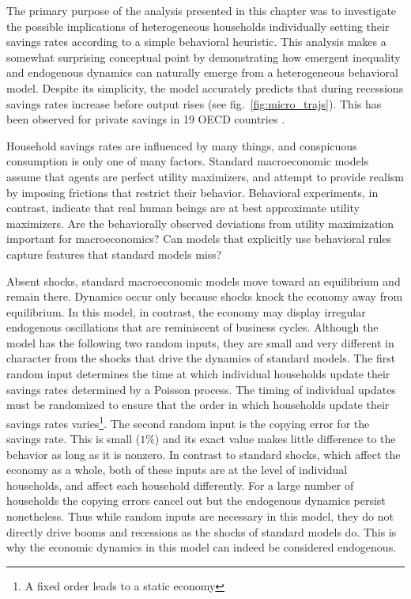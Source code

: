 The primary purpose of the analysis presented in this chapter was to investigate the possible implications of heterogeneous households individually setting their savings rates according to a simple behavioral heuristic. This analysis makes a somewhat surprising conceptual point by demonstrating how emergent inequality and endogenous dynamics can naturally emerge from a heterogeneous behavioral model. Despite its simplicity, the model accurately predicts that during recessions savings rates increase before output rises (see fig.~\ref{fig:micro_trajs}).
This has been observed for private savings in 19 OECD countries \citep{adema2015business}. 

Household savings rates are influenced by many things, and conspicuous consumption is only one of many factors. Standard macroeconomic models assume that agents are perfect utility maximizers, and attempt to provide realism by imposing frictions that restrict their behavior. Behavioral experiments, in contrast, indicate that real human beings are at best approximate utility maximizers.  Are the behaviorally observed deviations from utility maximization important for macroeconomics?  Can models that explicitly use behavioral rules capture features that standard models miss?

Absent shocks, standard macroeconomic models move toward an equilibrium and remain there.   Dynamics occur only because shocks knock the economy away from equilibrium. In this model, in contrast, the economy may display irregular endogenous oscillations that are reminiscent of business cycles.  
Although the model has the following two random inputs, they are small and very different in character from the shocks that drive the dynamics of standard models. The first random input determines the time at which individual households update their savings rates determined by a Poisson process. The timing of individual updates must be randomized to ensure that the order in which households update their savings rates varies\footnote{A fixed order leads to a static economy}. The second random input is the copying error for the savings rate.  This is small ($1\%$) and its exact value makes little difference to the behavior as long as it is nonzero. In contrast to standard shocks, which affect the economy as a whole, both of these inputs are at the level of individual households, and affect each household differently. For a large number of households the copying errors cancel out but the endogenous dynamics persist nonetheless. Thus while random inputs are necessary in this model, they do not directly drive booms and recessions as the shocks of standard models do. This is why the economic dynamics in this model can indeed be considered endogenous.

